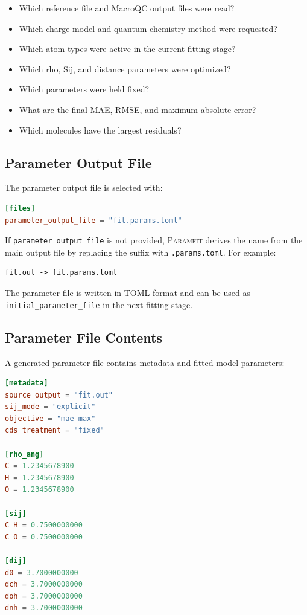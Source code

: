 \documentclass[11pt]{article}
\begin{document}
\begin{itemize}[leftmargin=*]
  \item Which reference file and MacroQC output files were read?
  \item Which charge model and quantum-chemistry method were requested?
  \item Which atom types were active in the current fitting stage?
  \item Which rho, Sij, and distance parameters were optimized?
  \item Which parameters were held fixed?
  \item What are the final MAE, RMSE, and maximum absolute error?
  \item Which molecules have the largest residuals?
\end{itemize}

\subsection{Parameter Output File}

The parameter output file is selected with:

\begin{lstlisting}[language=toml]
[files]
parameter_output_file = "fit.params.toml"
\end{lstlisting}

If \texttt{parameter\_output\_file} is not provided, \textsc{Paramfit} derives the
name from the main output file by replacing the suffix with
\texttt{.params.toml}. For example:

\begin{lstlisting}
fit.out -> fit.params.toml
\end{lstlisting}

The parameter file is written in TOML format and can be used as
\texttt{initial\_parameter\_file} in the next fitting stage.

\subsection{Parameter File Contents}

A generated parameter file contains metadata and fitted model parameters:

\begin{lstlisting}[language=toml]
[metadata]
source_output = "fit.out"
sij_mode = "explicit"
objective = "mae-max"
cds_treatment = "fixed"

[rho_ang]
C = 1.2345678900
H = 1.2345678900
O = 1.2345678900

[sij]
C_H = 0.7500000000
C_O = 0.7500000000

[dij]
d0 = 3.7000000000
dch = 3.7000000000
doh = 3.7000000000
dnh = 3.7000000000
\end{lstlisting}
\end{document}
